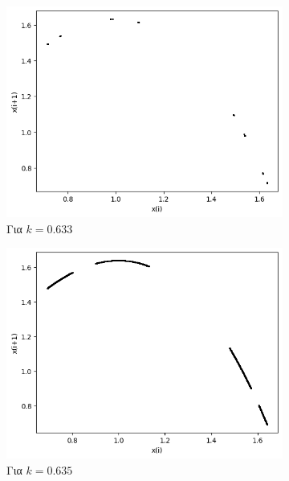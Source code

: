 \begin{figure}
	\centering
	\begin{subfigure}[b]{0.4\textwidth}
		\centering
		\includegraphics[width=\textwidth]{LateX images/graphs q09/g7}
		\caption{Για $k=0.633$}
		\label{f:k53}
	\end{subfigure}
	\hfill
	\begin{subfigure}[b]{0.4\textwidth}
		\centering
		\includegraphics[width=\textwidth]{LateX images/graphs q09/g8}
		\caption{Για $k=0.635$}
		\label{f:k54}
	\end{subfigure}
	\hfill
	\begin{subfigure}[b]{0.4\textwidth}
		\centering

\end{subfigure}
\end{figure}

